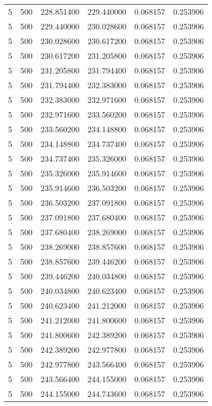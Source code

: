 \begin{longtable}{rrrrrr}
5 & 500 & 228.851400 & 229.440000 & 0.068157 & 0.253906 \\
5 & 500 & 229.440000 & 230.028600 & 0.068157 & 0.253906 \\
5 & 500 & 230.028600 & 230.617200 & 0.068157 & 0.253906 \\
5 & 500 & 230.617200 & 231.205800 & 0.068157 & 0.253906 \\
5 & 500 & 231.205800 & 231.794400 & 0.068157 & 0.253906 \\
5 & 500 & 231.794400 & 232.383000 & 0.068157 & 0.253906 \\
5 & 500 & 232.383000 & 232.971600 & 0.068157 & 0.253906 \\
5 & 500 & 232.971600 & 233.560200 & 0.068157 & 0.253906 \\
5 & 500 & 233.560200 & 234.148800 & 0.068157 & 0.253906 \\
5 & 500 & 234.148800 & 234.737400 & 0.068157 & 0.253906 \\
5 & 500 & 234.737400 & 235.326000 & 0.068157 & 0.253906 \\
5 & 500 & 235.326000 & 235.914600 & 0.068157 & 0.253906 \\
5 & 500 & 235.914600 & 236.503200 & 0.068157 & 0.253906 \\
5 & 500 & 236.503200 & 237.091800 & 0.068157 & 0.253906 \\
5 & 500 & 237.091800 & 237.680400 & 0.068157 & 0.253906 \\
5 & 500 & 237.680400 & 238.269000 & 0.068157 & 0.253906 \\
5 & 500 & 238.269000 & 238.857600 & 0.068157 & 0.253906 \\
5 & 500 & 238.857600 & 239.446200 & 0.068157 & 0.253906 \\
5 & 500 & 239.446200 & 240.034800 & 0.068157 & 0.253906 \\
5 & 500 & 240.034800 & 240.623400 & 0.068157 & 0.253906 \\
5 & 500 & 240.623400 & 241.212000 & 0.068157 & 0.253906 \\
5 & 500 & 241.212000 & 241.800600 & 0.068157 & 0.253906 \\
5 & 500 & 241.800600 & 242.389200 & 0.068157 & 0.253906 \\
5 & 500 & 242.389200 & 242.977800 & 0.068157 & 0.253906 \\
5 & 500 & 242.977800 & 243.566400 & 0.068157 & 0.253906 \\
5 & 500 & 243.566400 & 244.155000 & 0.068157 & 0.253906 \\
5 & 500 & 244.155000 & 244.743600 & 0.068157 & 0.253906 \\

\end{longtable}

